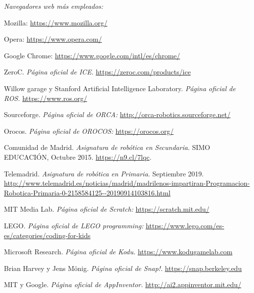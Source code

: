 \begin{thebibliography}{99}

    \textit{Navegadores web más empleados:}

    Mozilla: \url{https://www.mozilla.org/}
    
    Opera: \url{https://www.opera.com/}

    Google Chrome: \url{https://www.google.com/intl/es/chrome/}
    
    ZeroC. 
    \textit{Página oficial de ICE.}
    \url{https://zeroc.com/products/ice}
    
    Willow garage y Stanford Artificial Intelligence Laboratory.
    \textit{Página oficial de ROS.}
    \url{https://www.ros.org/}
    
    Sourceforge.
    \textit{Página oficial de ORCA:}
    \url{http://orca-robotics.sourceforge.net/}
    
    Orocos.
    \textit{Página oficial de OROCOS:}
    \url{https://orocos.org/}
    
    Comunidad de Madrid. %
    \textit{Asignatura de robótica en Secundaria.} %
    SIMO EDUCACIÓN, Octubre 2015. %
    \url{https://n9.cl/7lqc}. %

    Telemadrid. 
    \textit{Asignatura de robótica en Primaria.}
    Septiembre 2019. 
    \url{http://www.telemadrid.es/noticias/madrid/madrilenos-impartiran-Programacion-Robotica-Primaria-0-2158584125--20190914103816.html}

    MIT Media Lab.
    \textit{Página oficial de Scratch:}
    \url{https://scratch.mit.edu/}
    
    LEGO.
    \textit{Página oficial de LEGO programming:}
    \url{https://www.lego.com/es-es/categories/coding-for-kids}
    
    Microsoft Research.
    \textit{Página oficial de Kodu.}
    \url{https://www.kodugamelab.com}
    
    Brian Harvey y Jens Mönig.
    \textit{Página oficial de Snap!.}
    \url{https://snap.berkeley.edu}
    
    MIT y Google.
    \textit{Página oficial de AppInventor.}
    \url{http://ai2.appinventor.mit.edu/}
    

\end{thebibliography}

